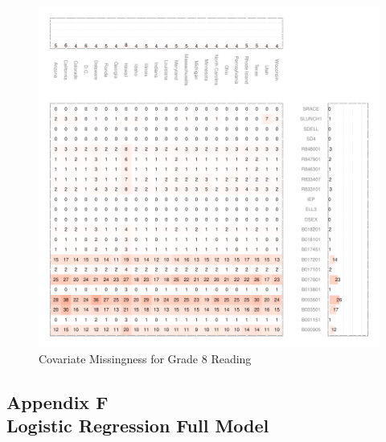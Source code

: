 \documentclass[letterpaper,12p,twoside]{article} %
\begin{document}
{\begin{figure}[h]
\begin{center}
\includegraphics[width=\textwidth]{../Figures2009/g8read-missing.pdf}
\caption{Covariate Missingness for Grade 8 Reading}
\label{fig:g8reading:missing}
\end{center}
\end{figure}


\clearpage
{}
\subsection*{Appendix F\\Logistic Regression Full Model}
\label{appendixlogistic}

}
\end{document}
